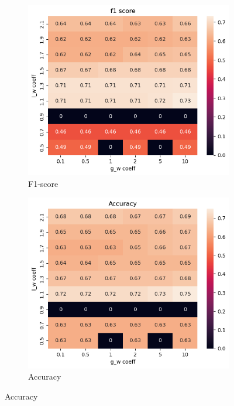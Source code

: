 \documentclass[a4paper,11pt]{article}
\begin{document}
\begin{figure}[h!]
    \centering
    \begin{subfigure}{0.32\textwidth}
        \includegraphics[width=\textwidth]{figures/f1_score_results_bis.png}
        \caption{F1-score}
        \label{fig:f1_score_bis}
    \end{subfigure}
    \begin{subfigure}{0.32\textwidth}
        \includegraphics[width=\textwidth]{figures/accuracy_results_bis.png}
        \caption{Accuracy}

\end{subfigure}
\end{figure}
\end{document}
